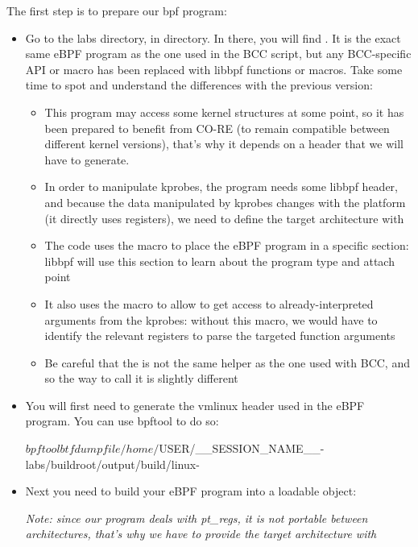 The first step is to prepare our bpf program:
\begin{itemize}
  \item Go to the labs directory, in  directory. In there, you will find . It is the exact same eBPF program as the one used in the BCC script, but any BCC-specific API or macro has been replaced with libbpf functions or macros. Take some time to spot and understand the differences with the previous version:
    \begin{itemize}
      \item This program may access some kernel structures at some point, so it has been prepared to benefit from CO-RE (to remain compatible between different kernel versions), that's why it depends on a  header that we will have to generate.
      \item In order to manipulate kprobes, the program needs some libbpf header, and because the data manipulated by kprobes changes with the platform (it directly uses registers), we need to define the target architecture with
      \item The code uses the  macro to place the eBPF program in a specific section: libbpf will use this section to learn about the program type and attach point
      \item It also uses the  macro to allow to get access to already-interpreted arguments from the kprobes: without this macro, we would have to identify the relevant registers to parse the targeted function arguments
      \item Be careful that the  is not the same helper as the one used with BCC, and so the way to call it is slightly different
    \end{itemize}
  \item You will first need to generate the vmlinux header used in the eBPF program. You can use bpftool to do so:
  \begin{bashinput}
$ bpftool btf dump file /home/${USER}/__SESSION_NAME__-labs/buildroot/output/build/linux-%
  \end{bashinput}
  \item Next you need to build your eBPF program into a loadable object:
{\em Note: since our program deals with pt\_regs, it is not portable
		between architectures, that's why we have to provide the
		target architecture with
		}
\end{itemize}

